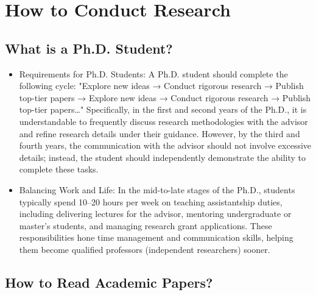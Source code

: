 \documentclass[conference]{IEEEtran}
\begin{document}
\section{How to Conduct Research}
\subsection{What is a Ph.D. Student?}\label{AA}
\begin{itemize}
\item Requirements for Ph.D. Students: A Ph.D. student should complete the following cycle: "Explore new ideas → Conduct rigorous research → Publish top-tier papers → Explore new ideas → Conduct rigorous research → Publish top-tier papers…" Specifically, in the first and second years of the Ph.D., it is understandable to frequently discuss research methodologies with the advisor and refine research details under their guidance. However, by the third and fourth years, the communication with the advisor should not involve excessive details; instead, the student should independently demonstrate the ability to complete these tasks.

\item Balancing Work and Life: In the mid-to-late stages of the Ph.D., students typically spend 10–20 hours per week on teaching assistantship duties, including delivering lectures for the advisor, mentoring undergraduate or master's students, and managing research grant applications. These responsibilities hone time management and communication skills, helping them become qualified professors (independent researchers) sooner.
\end{itemize}
\subsection{How to Read Academic Papers?}\label{BB}
\end{document}
